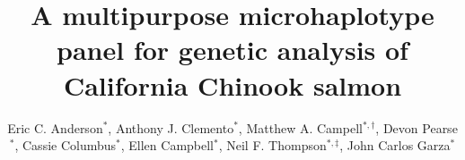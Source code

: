 

\newcommand{\myTitle}{A multipurpose microhaplotype panel for genetic analysis of California Chinook salmon}
\title{\myTitle}

\newcommand{\myAuthors}{Eric C. Anderson$^{*,\S}$, Anthony J. Clemento$^{*}$, Matthew A. Campell$^{*,\dagger}$, Devon Pearse$^{*}$, Cassie Columbus$^{*}$, Ellen Campbell$^{*}$, Neil F. Thompson$^{*,\ddag}$, John Carlos Garza$^{*}$}
\author{Eric C. Anderson$^{*}$, Anthony J. Clemento$^{*}$, Matthew A. Campell$^{*,\dagger}$, Devon Pearse$^{*}$, Cassie Columbus$^{*}$, Ellen Campbell$^{*}$, Neil F. Thompson$^{*,\ddag}$, John Carlos Garza$^{*}$}


\newcommand{\myAffiliations}{
$^*$Southwest Fisheries Science Center, National Marine Fisheries Service, NOAA, Santa Cruz, California, USA. $^\dagger$Current address: Mac's home address in AK. $^\ddag$Current address: Get Neil's address.
}

\renewcommand{\AuthorAddresses}{\myAffiliations}

\renewcommand{\KeyWords}{Genetic stock identfication, population assignment, parentage based tagging, amplicon sequencing}

\renewcommand{\CorrespondingAuthor}{eric.c.anderson@noaa.gov}


\newcommand{\myEmailAddress}{eric.c.anderson@noaa.gov}
\newcommand{\myEmailFootnote}{$^\S$}

\newcommand{\myCopyright}{\copyright US Federal Government work in the public domain in the USA}

\newcommand{\myRunningTitle}{Microhaplotypes for California Chinook salmon}
\renewcommand{\RunningTitle}{\myRunningTitle}

\newcommand{\myRunningAuthor}{Anderson et al.}

